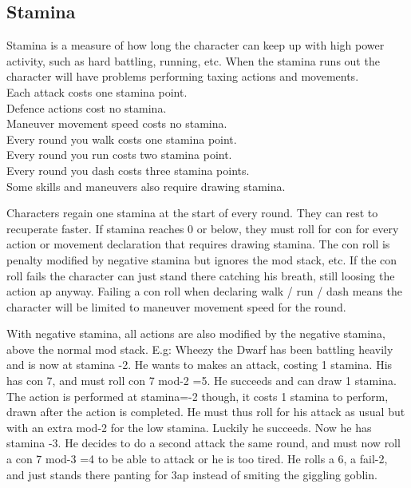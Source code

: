 
\subsection*{Stamina}
Stamina is a measure of how long the character can keep up with high power activity, such as hard battling, running, etc. When the stamina runs out the character will have problems performing taxing actions and movements. \\
Each attack costs one stamina point. \\
Defence actions cost no stamina.\\
Maneuver movement speed costs no stamina.\\
Every round you walk costs one stamina point. \\
Every round you run costs two stamina point. \\
Every round you dash costs three stamina points. \\
Some skills and maneuvers also require drawing stamina.


Characters regain one stamina at the start of every round. They can rest to recuperate faster.
If stamina reaches 0 or below, they must roll for con for every action or movement declaration that requires drawing stamina. The con roll is penalty modified by negative stamina but ignores the mod stack, etc.
If the con roll fails the character can just stand there catching his breath, still loosing the action ap anyway. Failing a con roll when declaring walk / run / dash means the character will be limited to maneuver movement speed for the round.

With negative stamina, all actions are also modified by the negative stamina, above the normal mod stack.
E.g: Wheezy the Dwarf has been battling heavily and is now at stamina -2. He wants to makes an attack, costing 1 stamina. His has con 7, and must roll con 7 mod-2 =5. He succeeds and can draw 1 stamina. The action is performed at stamina=-2 though, it costs 1 stamina to perform, drawn after the action is completed. He must thus roll for his attack as usual but with an extra mod-2 for the low stamina. Luckily he succeeds. Now he has stamina -3. He decides to do a second attack the same round, and must now roll a con 7 mod-3 =4 to be able to attack or he is too tired. He rolls a 6, a fail-2, and just stands there panting for 3ap instead of smiting the giggling goblin.

